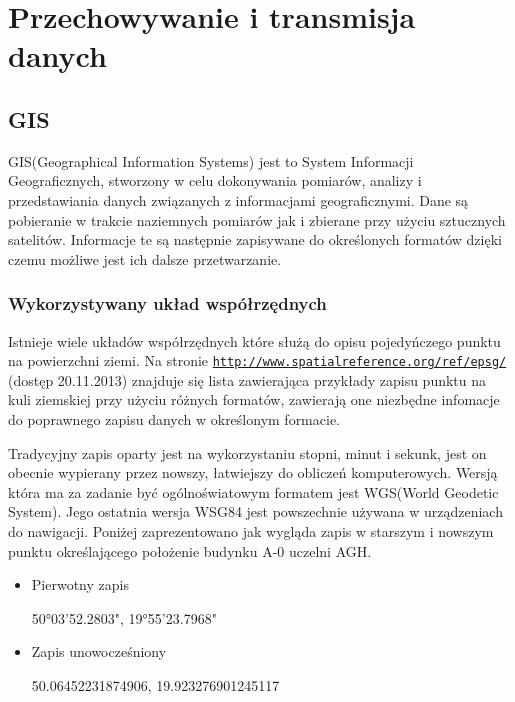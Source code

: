 \clearpage
\newpage
\section{Przechowywanie i transmisja danych}
\label{sec:przesyl}

\subsection{GIS}
\label{subsec:gis}

GIS(Geographical Information Systems) jest to System Informacji Geograficznych, stworzony w celu dokonywania pomiarów, analizy i przedstawiania danych związanych z informacjami geograficznymi. Dane są pobieranie w trakcie naziemnych pomiarów jak i zbierane przy użyciu sztucznych satelitów. Informacje te są następnie zapisywane do określonych formatów dzięki czemu możliwe jest ich dalsze przetwarzanie.

\subsubsection{Wykorzystywany układ współrzędnych}
\label{subsec:uklad}

Istnieje wiele układów współrzędnych które służą do opisu pojedyńczego punktu na powierzchni ziemi. Na stronie \underline{\texttt{http://www.spatialreference.org/ref/epsg/}} (dostęp 20.11.2013) znajduje się lista zawierająca przykłady zapisu punktu na kuli ziemskiej przy użyciu różnych formatów, zawierają one niezbędne infomacje do poprawnego zapisu danych w określonym formacie.

Tradycyjny zapis oparty jest na wykorzystaniu stopni, minut i sekunk, jest on obecnie wypierany przez nowszy, łatwiejszy do obliczeń komputerowych. Wersją która ma za zadanie być ogólnoświatowym formatem jest WGS(World Geodetic System). Jego ostatnia wersja  WSG84 jest powszechnie używana w urządzeniach do nawigacji. Poniżej zaprezentowano jak wygląda zapis w starszym i nowszym punktu określającego położenie budynku A-0 uczelni AGH.

\begin{itemize}

\item
Pierwotny zapis

50°03'52.2803", 19°55'23.7968"
\item
Zapis unowocześniony

50.06452231874906, 19.923276901245117
\end{itemize}

